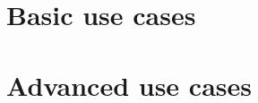 

\usepackage{lipsum}
\usepackage{blindtext}



\renewcommand{\onlyinsubfile}[1]{}
\renewcommand{\notinsubfile}[1]{#1}



\makecoverpage



\frontmatter




\tableofcontents

\printglossary[type=\acronymtype,title=\listofacronymsname,toctitle=\listofacronymsname]
\printglossary

\printnomenclature


\mainmatter

\part{Basic use cases}





\part{Advanced use cases}





